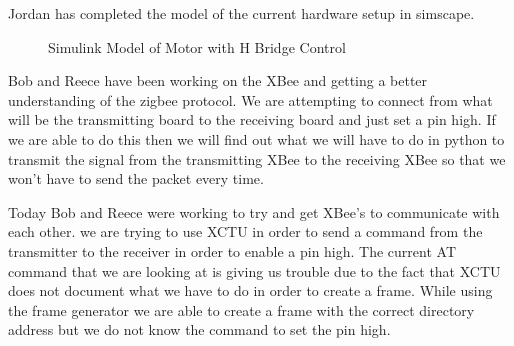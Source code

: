 \documentclass[fontsize=11pt, %
                             paper=letter, %
                             twoside, %
                             captions=tableheading,
                             index=totoc,
                             hyperref]{labbook}
\begin{document}
Jordan has completed the model of the current hardware setup in simscape. 
\begin{figure}
  \centering
  \caption{Simulink Model of Motor with H Bridge Control}
  \label{fig:motorModelWithHBridge}
\end{figure}
\newline
Bob and Reece have been working on the XBee and getting a better understanding of the zigbee protocol. We are attempting to connect from what will be the transmitting board to the receiving board and just set a pin high. If we are able to do this then we will find out what we will have to do in python to transmit the signal from the transmitting XBee to the receiving XBee so that we won't have to send the packet every time.

Today Bob and Reece were working to try and get XBee's to communicate with each other. we are trying to use XCTU in order to send a command from the transmitter to the receiver in order to enable a pin high. The current AT command that we are looking at is giving us trouble due to the fact that XCTU does not document what we have to do in order to create a frame. While using the frame generator we are able to create a frame with the correct directory address but we do not know the command to set the pin high. 
\end{document}
